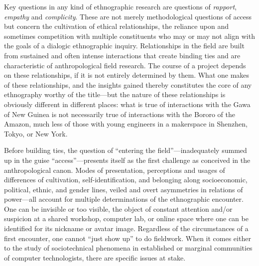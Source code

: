 \documentclass[10pt,letter,oneside]{scrartcl}
\begin{document}
Key questions in any kind of ethnographic research are questions of
\emph{rapport}, \emph{empathy} and \emph{complicity}.  These are not
merely methodological questions of access but concern the cultivation
of ethical relationships, the reliance upon and sometimes competition
with multiple constituents who may or may not align with the goals of 
a dialogic ethnographic inquiry. Relationships in the field are built 
from sustained and often intense interactions that create binding ties 
and are characteristic of anthropological field research. The course of 
a project depends on these relationships, if it is not entirely 
determined by them.  What one makes of these relationships, and the 
insights gained thereby constitutes the core of any ethnography worthy 
of the title---but the nature of these relationships is obviously different 
in different places:  what is true of interactions with the Gawa of New 
Guinea is not necessarily true of interactions with the Bororo of the 
Amazon, much less of those with young engineers in a makerspace 
in Shenzhen, Tokyo, or New York.

Before building ties, the question of ``entering the field''---inadequately 
summed up in the guise ``access''---presents itself as the first challenge 
as conceived in the anthropological canon.  Modes of presentation, perceptions 
and usages of differences of cultivation, self-identification, and belonging 
along socioeconomic, political, ethnic, and gender lines, veiled and overt 
asymmetries in relations of power---all account for multiple determinations of 
the ethnographic encounter. One can be invisible or too visible, the object 
of constant attention and/or suspicion at a shared workshop, computer lab, or
online space where one can be identified for its nickname or avatar image.  
Regardless of the circumstances of a first encounter, one cannot ``just show up'' 
to do fieldwork.  When it comes either to the study of sociotechnical phenomena 
in established or marginal communities of computer technologists, there are 
specific issues at stake.
\end{document}
